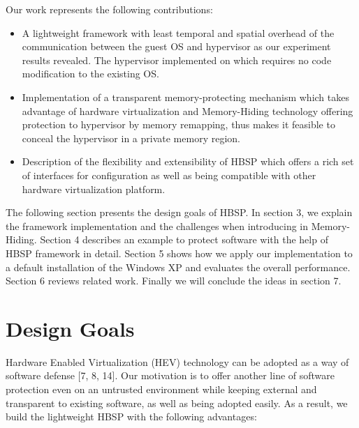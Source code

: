 \documentclass[conference]{IEEEtran}
\begin{document}

Our work represents the following contributions:
\begin{itemize}
\item A lightweight framework with least temporal and spatial
overhead of the communication between the guest OS and hypervisor as
our experiment results revealed. The hypervisor implemented on which
requires no code modification to the existing OS.\item
Implementation of a transparent memory-protecting mechanism which
takes advantage of hardware virtualization and Memory-Hiding
technology offering protection to hypervisor by memory remapping,
thus makes it feasible to conceal the hypervisor in a private memory
region.\item Description of the flexibility and extensibility of
HBSP which offers a rich set of interfaces for configuration as well
as being compatible with other hardware virtualization platform.
\end{itemize}

The following section presents the design goals of HBSP. In section
3, we explain the framework implementation and the challenges when
introducing in Memory-Hiding. Section 4 describes an example to
protect software with the help of HBSP framework in detail. Section
5 shows how we apply our implementation to a default installation of
the Windows XP and evaluates the overall performance. Section 6
reviews related work. Finally we will conclude the ideas in section
7.

\bigskip

\section{Design Goals}
Hardware Enabled Virtualization (HEV) technology can be adopted as
a way of software defense [7, 8, 14]. Our motivation is to offer
another line of software protection even on an untrusted
environment while keeping external and transparent to existing
software, as well as being adopted easily. As a result, we build
the lightweight HBSP with the following advantages:
\end{document}
